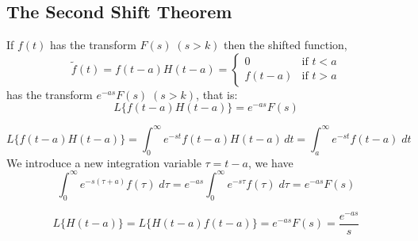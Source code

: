 \documentclass[a4paper, 10pt]{article}
\begin{document}
\pagebreak

\subsection{The Second Shift Theorem}
\begin{theorembox}
  If $f(t)$ has the transform $F(s) \; (s > k)$ then the shifted function, 
  $$
  \tilde{f}(t) = f(t-a)H(t-a) = \begin{cases}
    0 & \text{if } t < a \\
    f(t-a) & \text{if } t > a
  \end{cases}
  $$
  has the transform $e^{-as}F(s)\; (s > k)$, that is:
  $$L\{f(t-a)H(t-a)\} = e^{-as}F(s)$$
\end{theorembox}

\begin{proofbox}
  $$L\{f(t-a)H(t-a)\} = \int_0^\infty e^{-st}f(t-a)H(t-a)\, dt = \int_a^\infty e^{-st}f(t-a)\;dt$$
  We introduce a new integration variable $\tau = t-a$, we have
  $$\int_0^\infty e^{-s(\tau + a)}f(\tau)\;d\tau = e^{-as}\int_0^\infty e^{-s\tau}f(\tau)\;d\tau = e^{-as}F(s)$$
\end{proofbox}

\begin{examplebox}
  $$L\{H(t-a)\} = L\{H(t-a)f(t-a)\} = e^{-as}F(s) = \dfrac{e^{-as}}{s}$$
\end{examplebox}
\end{document}
